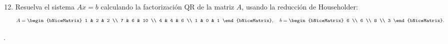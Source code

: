 \begin{frame}
	\begin{enumerate}\setcounter{enumi}{11}
		\item


		      Resuelva el sistema $Ax=b$ calculando la factorización QR
		      de la matriz $A$, usando la reducción de Householder:
		      \begin{equation*}
			      A=
			      \begin{bNiceMatrix}
				      1 & 2 & 2  \\
				      7 & 6 & 10 \\
				      4 & 4 & 6  \\
				      1 & 0 & 1
			      \end{bNiceMatrix},\quad
			      b=
			      \begin{bNiceMatrix}
				      6 \\
				      6 \\
				      8 \\
				      3
			      \end{bNiceMatrix}.
		      \end{equation*}
	\end{enumerate}

	\begin{solution}
		.
	\end{solution}
\end{frame}
